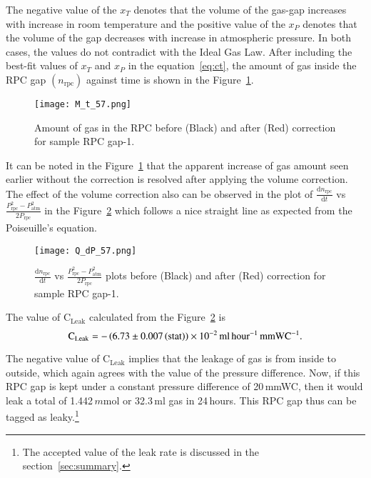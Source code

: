 The negative value of the $x_T$ denotes that the volume of the gas-gap
increases with increase in room temperature and the positive value of the
$x_P$ denotes that the volume of the gap decreases with increase in atmospheric
pressure. In both cases, the values do not contradict with the Ideal Gas Law.
After including the best-fit values of $x_T$ and $x_P$ in the
equation~\ref{eq:ct}, the amount of gas inside the RPC gap
$\left(n_{\textrm{rpc}}\right)$ against time is shown in the Figure~\ref{fig:with}.
\begin{figure}[h]
  \centering
  \texttt{[image: M\_t\_57.png]}
  \caption{Amount of gas in the RPC before (Black) and after (Red) correction
    for sample RPC gap-1.
  }
  \label{fig:with}
\end{figure} 
It can be noted in the Figure~\ref{fig:with} that the apparent
increase of gas amount seen earlier without the correction is resolved
after applying the volume correction. The effect of the volume
correction also can be observed in the plot of
$\frac{\mathrm{d}n_{\textrm{rpc}}}{\mathrm{d}t}$ vs
$\frac{P_{\textrm{rpc}}^{2}-P_{\textrm{atm}}^{2}}{2P_{\textrm{rpc}}}$ in the
Figure~\ref{fig:qt} which follows a nice straight line as expected
from the Poiseuille's equation.
\begin{figure}[h]
  \centering
  \texttt{[image: Q\_dP\_57.png]}
  \caption{$\frac{\mathrm{d}n_{\textrm{rpc}}}{\mathrm{d}t}$ vs
    $\frac{P_{\textrm{rpc}}^{2}-P_{\textrm{atm}}^{2}}{2P_{\textrm{rpc}}}$ plots before
    (Black) and after (Red) correction for sample RPC gap-1.}
  \label{fig:qt}
\end{figure}

The value of $\textrm{C}_{\textrm{Leak}}$ calculated from the
Figure~\ref{fig:qt} is
\[\textrm{C}_{\textrm{Leak}}=-\left(6.73\pm 0.007\left(\textrm{stat}\right)\right)\times 10^{-2}\textrm{\,ml\,hour$^{-1}$\,mmWC$^{-1}$}.\]

The negative value of $\textrm{C}_{\textrm{Leak}}$ implies that the
leakage of gas is from inside to outside, which again agrees with the
value of the pressure difference. Now, if this RPC gap is kept under a
constant pressure difference of 20\,mmWC, then it would leak a total
of 1.442\,$m$mol or 32.3\,ml gas in 24\,hours. This RPC gap thus can
be tagged as leaky.\footnote{The accepted value of the leak rate is
  discussed in the section~\ref{sec:summary}.}

